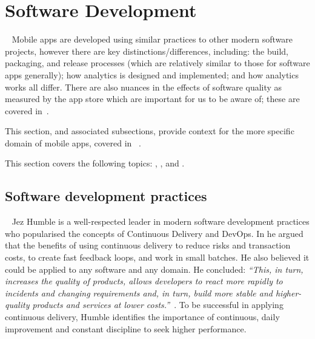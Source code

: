 

\section{Software Development}~\label{rw-software-development-section}
Mobile apps are developed using similar practices to other modern software projects, however there are key distinctions/differences, including: the build, packaging, and release processes (which are relatively similar to those for software apps generally); how analytics is designed and implemented; and how analytics works all differ. There are also nuances in the effects of software quality as measured by the app store which are important for us to be aware of; these are covered in~.

This section, and associated subsections, provide context for the more specific domain of mobile apps, covered in ~.
 
This section covers the following topics: , , and .

\subsection{Software development practices}~\label{rw-software-development-practices-topic}
Jez Humble is a well-respected leader in modern software development practices who popularised the concepts of Continuous Delivery and DevOps. In  he argued that the benefits of using continuous delivery to reduce risks and transaction costs, to create fast feedback loops, and work in small batches. He also believed it could be applied to any software and any domain. He concluded: \emph{``This, in turn, increases the quality of products, allows developers to react more rapidly to incidents and changing requirements and, in turn, build more stable and higher-quality products and services at lower costs.''}~. To be successful in applying continuous delivery, Humble identifies the importance of continuous, daily improvement and constant discipline to seek higher performance. 

